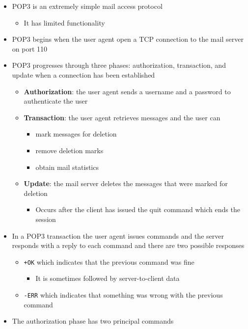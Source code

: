 \documentclass[11pt]{article}
\providecommand{\tightlist}{%
      \setlength{\itemsep}{0pt}\setlength{\parskip}{0pt}}
\begin{document}
\begin{itemize}
\item
  POP3 is an extremely simple mail access protocol

  \begin{itemize}
  \tightlist
  \item
    It has limited functionality
  \end{itemize}
\item
  POP3 begins when the user agent open a TCP connection to the mail
  server on port 110
\item
  POP3 progresses through three phases: authorization, transaction, and
  update when a connection has been established

  \begin{itemize}
  \tightlist
  \item
    \textbf{Authorization}: the user agent sends a username and a
    password to authenticate the user
  \item
    \textbf{Transaction}: the user agent retrieves messages and the user
    can

    \begin{itemize}
    \tightlist
    \item
      mark messages for deletion
    \item
      remove deletion marks
    \item
      obtain mail statistics
    \end{itemize}
  \item
    \textbf{Update}: the mail server deletes the messages that were
    marked for deletion

    \begin{itemize}
    \tightlist
    \item
      Occurs after the client has issued the quit command which ends the
      session
    \end{itemize}
  \end{itemize}
\item
  In a POP3 transaction the user agent issues commands and the server
  responds with a reply to each command and there are two possible
  responses

  \begin{itemize}
  \tightlist
  \item
    \texttt{+OK} which indicates that the previous command was fine

    \begin{itemize}
    \tightlist
    \item
      It is sometimes followed by server-to-client data
    \end{itemize}
  \item
    \texttt{-ERR} which indicates that something was wrong with the
    previous command
  \end{itemize}
\item
  The authorization phase has two principal commands


\end{itemize}
\end{document}
